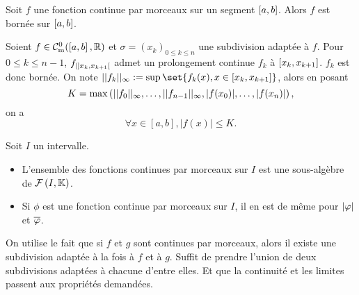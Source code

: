 \documentclass{magnolia}
\begin{document}
\begin{proposition}[utile=3]
Soit $f$ une fonction continue par morceaux sur un segment $\left[a,b\right]$.
Alors $f$ est bornée sur $\left[a,b\right]$.
\end{proposition}

\begin{preuve}
Soient $f\in \mathcal{C}_{{\rm m}}^0(\left[a,b\right],\mathbb{R})$ et $\sigma=(x_k)_{0\leq k\leq n}$ une subdivision adaptée à $f$. Pour $0\leq k \leq n-1$, $f_{|\left]x_k,x_{k+1}\right[}$ admet un prolongement continue $f_k$ à $\left[x_k,x_{k+1}\right]$. $f_k$ est donc bornée. On note $||f_k||_{\infty}:=\sup\set{f_k(x), x \in \interf{x_k}{x_{k+1}}}$, alors en posant $$K=\max\left(||f_0||_{\infty},\ldots,||f_{n-1}||_{\infty},|f(x_0)|,\ldots,|f(x_n)|\right),$$ on a $$\forall x \in [a,b], |f(x)|\leq K.$$
\end{preuve}


\begin{proposition}[utile=-3]
Soit $I$ un intervalle.
\begin{itemize}
\item L'ensemble des fonctions continues par morceaux sur $I$ est une
  sous-algèbre de $\mathcal{F}\left(I,\mathbb{K}\right)$.
\item Si $\phi$ est une fonction continue par morceaux sur $I$, il en est de même pour $\left|\varphi\right|$ et $\overline{\varphi}$.
\end{itemize}
\end{proposition}

\begin{preuve}
On utilise le fait que si $f$ et $g$ sont continues par morceaux, alors il existe une
subdivision adaptée à la fois à $f$ et à $g$. Suffit de prendre l'union de deux subdivisions adaptées à chacune d'entre elles. Et que la continuité et les limites passent aux propriétés demandées.
\end{preuve}
\end{document}
